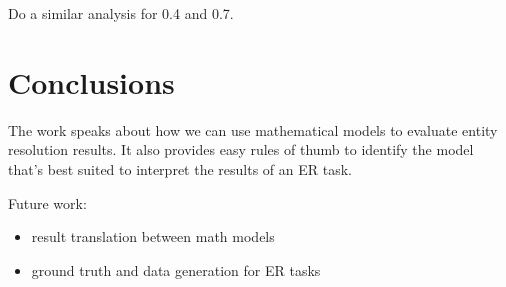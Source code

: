 \documentclass[11pt]{article}
\begin{document}
    Do a similar analysis for 0.4 and 0.7.

    \section[conclusion]{Conclusions}\label{section:conclusions}

    The work speaks about how we can use mathematical models to evaluate entity resolution results. It also provides easy rules of thumb to identify the model that's best suited to interpret the results of an ER task.
    
    Future work:
    \begin{itemize}
        \item result translation between math models
        \item ground truth and data generation for ER tasks
    \end{itemize}
\end{document}
